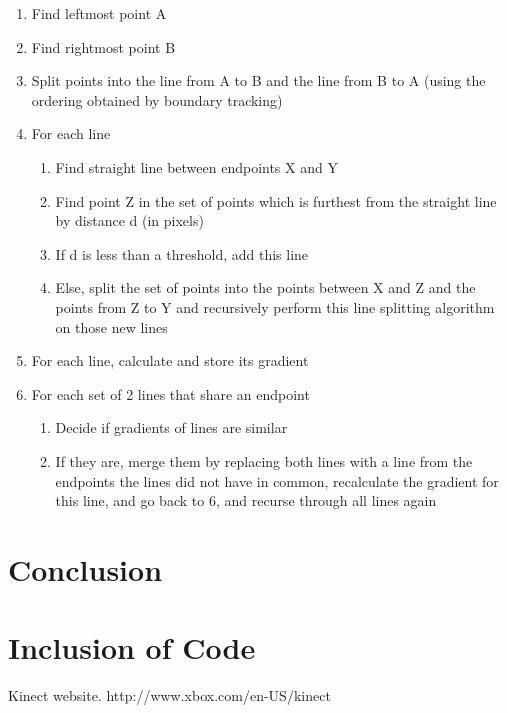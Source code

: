 \documentclass[parskip]{cs4rep}
\begin{document}
\begin{enumerate}
\item
Find leftmost point A
\item
Find rightmost point B
\item
Split points into the line from A to B and the line from B to A (using the ordering obtained by boundary tracking)
\item
For each line
    \begin{enumerate}
    \item
    Find straight line between endpoints X and Y
    \item
    Find point Z in the set of points which is furthest from the straight line by distance d (in pixels)
    \item
    If d is less than a threshold, add this line
    \item
    Else, split the set of points into the points between X and Z and the points from Z to Y and recursively perform this line splitting algorithm on those new lines
    \end{enumerate}
\item
For each line, calculate and store its gradient
\item
For each set of 2 lines that share an endpoint
    \begin{enumerate}
    \item
    Decide if gradients of lines are similar
    \item
    If they are, merge them by replacing both lines with a line from the endpoints the lines did not have in common, recalculate the gradient for this line, and go back to 6, and recurse through all lines again
    \end{enumerate}
\end{enumerate}

\chapter{Conclusion}

\chapter{Inclusion of Code}

%

\begin{thebibliography}{50}
Kinect website. http://www.xbox.com/en-US/kinect
\end{thebibliography}
\end{document}
